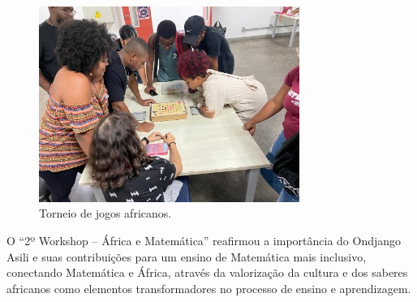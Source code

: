\documentclass{hipatia}
\begin{document}
\begin{figure}[htb]
    \centering
    \includegraphics[width=8.5cm]{WAM4.jpg}
    \caption{Torneio de jogos africanos.}
 \label{WAM4}
\end{figure}

O ``2º Workshop – África e Matemática'' reafirmou a importância do Ondjango Asili e suas contribuições para um ensino de Matemática mais inclusivo, conectando Matemática e África, através da valorização da cultura e dos saberes africanos como elementos transformadores no processo de ensino e aprendizagem.




\end{document}
